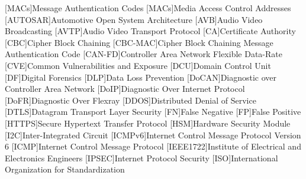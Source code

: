\begin{acronym}
[MACs]{Message Authentication Codes}	%
[MACs]{Media Access Control Addresses}	%
[AUTOSAR]{Automotive Open System Architecture}    %
[AVB]{Audio Video Broadcasting}
[AVTP]{Audio Video Transport Protocol}
[CA]{Certificate Authority}
[CBC]{Cipher Block Chaining}    %
[CBC-MAC]{Cipher Block Chaining Message Authentication Code}    %
[CAN-FD]{Controller Area Network Flexible Data-Rate}
[CVE]{Common Vulnerabilities and Exposure}
[DCU]{Domain Control Unit}
[DF]{Digital Forensics}
[DLP]{Data Loss Prevention}
[DoCAN]{Diagnostic over Controller Area Network}
[DoIP]{Diagnostic Over Internet Protocol}
[DoFR]{Diagnostic Over Flexray}
[DDOS]{Distributed Denial of Service}
[DTLS]{Datagram Transport Layer Security}
[FN]{False Negative}
[FP]{False Positive}
[HTTPS]{Secure Hypertext Transfer Protocol }
[HSM]{Hardware Security Module}
[I2C]{Inter-Integrated Circuit}
[ICMPv6]{Internet Control Message Protocol Version 6}
[ICMP]{Internet Control Message Protocol}
[IEEE1722]{Institute of Electrical and Electronics Engineers}
[IPSEC]{Internet Protocol Security}
[ISO]{International Organization for Standardization}

\end{acronym}
